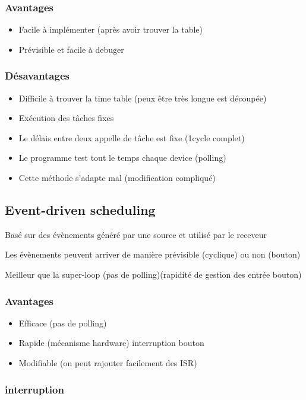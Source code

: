 \documentclass[resume]{subfiles}
\begin{document}
\subsubsection{Avantages}
\begin{itemize}
\item Facile à implémenter (après avoir trouver la table)
\item Prévisible et facile à debuger
\end{itemize}

\subsubsection{Désavantages}
\begin{itemize}
\item Difficile à trouver la time table (peux être très longue est découpée)
\item Exécution des tâches fixes 
\item Le délais entre deux appelle de tâche est fixe (1cycle complet)
\item Le programme test tout le temps chaque device (polling)
\item Cette méthode s'adapte mal (modification compliqué)
\end{itemize}

\subsection{Event-driven scheduling}

Basé sur des évènements généré par une source et utilisé par le receveur

Les évènements peuvent arriver de manière prévisible (cyclique) ou non (bouton)

Meilleur que la super-loop (pas de polling)(rapidité de gestion des entrée bouton)

\subsubsection{Avantages}
\begin{itemize}
\item Efficace (pas de polling)
\item Rapide (mécanisme hardware) interruption bouton
\item Modifiable (on peut rajouter facilement des ISR)
\end{itemize}

\subsubsection{interruption}
\end{document}
